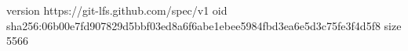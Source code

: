 version https://git-lfs.github.com/spec/v1
oid sha256:06b00e7fd907829d5bbf03ed8a6f6abe1ebee5984fbd3ea6e5d3c75fe3f4d5f8
size 5566
